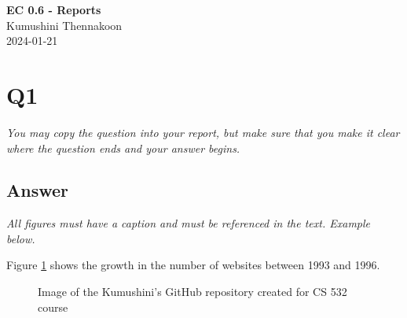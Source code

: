 \documentclass[12pt]{article}
\begin{document}
\begin{centering}
{\large\textbf{EC 0.6 - Reports}}\\ 
Kumushini Thennakoon\\
2024-01-21\\
\end{centering}


\section*{Q1}

\emph{You may copy the question into your report, but make sure that you make it clear where the question ends and your answer begins.}

\subsection*{Answer}

\emph{All figures must have a caption and must be referenced in the text. Example below.}

Figure \ref{fig:web-growth} shows the growth in the number of websites between 1993 and 1996.

\begin{figure}[h!]
    \centering
    \caption{Image of the Kumushini's GitHub repository created for CS 532 course}
    \label{fig:web-growth}
\end{figure}
\end{document}
